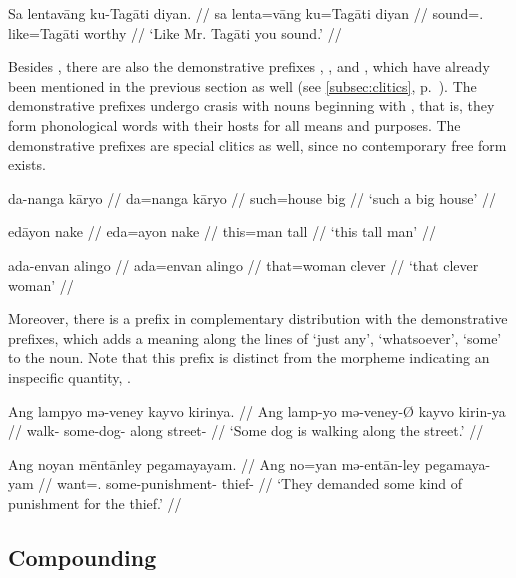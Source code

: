 \a\begingl
	\gla Sa lentavāng ku-​Tagāti diyan. //
	\glb sa lenta=vāng ku=​Tagāti diyan //
	\glc \PatT{} sound=\Second{}.\Aarg{} like=​Tagāti worthy //
	\glft `Like Mr. Tagāti you sound.' //
\endgl
\xe

Besides , there are also the demonstrative prefixes
, , and ,
which have already been mentioned in the previous section as well (see
\autoref{subsec:clitics}, p.~\pageref{clitics_prenoun_dem}). The demonstrative
prefixes undergo crasis with nouns beginning with , that is, they form
phonological words with their hosts for all means and purposes. The
demonstrative prefixes are special clitics as well, since no contemporary free
form exists.

\pex
\a\begingl
	\gla da-nanga kāryo //
	\glb da=nanga kāryo //
	\glc such=house big //
	\glft `such a big house' //
\endgl

\a\begingl
	\gla edāyon nake //
	\glb eda=ayon nake //
	\glc this=man tall //
	\glft `this tall man' //
\endgl

\a\begingl
	\gla ada-envan alingo //
	\glb ada=envan alingo //
	\glc that=woman clever //
	\glft `that clever woman' //
\endgl

\xe

Moreover, there is a prefix  in complementary distribution with
the demonstrative prefixes, which adds a meaning along the lines of `just any',
`whatsoever', `some' to the noun. Note that this prefix is distinct from the
morpheme indicating an inspecific quantity, .

\pex
\a\begingl
	\gla Ang lampyo mə-veney kayvo kirinya. //
	\glb Ang lamp-yo mə-veney-Ø kayvo kirin-ya //
	\glc \AgtT{} walk-\TsgN{} some-dog-\Top{} along street-\Loc{} //
	\glft `Some dog is walking along the street.' //
\endgl

\a\begingl
	\gla Ang noyan mēntānley pegamayayam. //
	\glb Ang no=yan mə-entān-ley pegamaya-yam //
	\glc \AgtT{} want=\TsgM{}.\Top{} some-punishment-\PargI{} 
		thief-\Dat{} //
	\glft `They demanded some kind of punishment for the thief.' //
\endgl

\xe


\subsection{Compounding}


